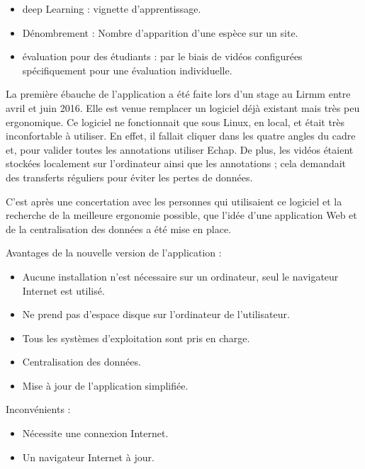 \documentclass[12pt]{article}
\begin{document}
\begin{itemize}
\item deep Learning : vignette d’apprentissage.
\item Dénombrement : Nombre d'apparition d'une espèce sur un site.
\item évaluation pour des étudiants : par le biais de vidéos configurées spécifiquement pour une évaluation individuelle.
\end{itemize}

\par

La première ébauche de l’application a été faite lors d’un stage au Lirmm entre avril et juin 2016. Elle est venue remplacer un logiciel déjà existant mais très peu ergonomique. Ce logiciel ne fonctionnait que sous Linux, en local, et était très inconfortable à utiliser. En effet, il fallait cliquer dans les quatre angles du cadre et, pour valider toutes les annotations utiliser Echap. De plus, les vidéos étaient stockées localement sur l’ordinateur ainsi que les annotations ; cela demandait des transferts réguliers pour éviter les pertes de données.
\par
C’est après une concertation avec les personnes qui utilisaient ce logiciel et la recherche de la meilleure ergonomie possible, que l’idée d’une application Web et de la centralisation des données a été mise en place.

Avantages de la nouvelle version de l'application :

\begin{itemize}
    \item Aucune installation n’est nécessaire sur un ordinateur, seul le navigateur Internet est utilisé. \item Ne prend pas d’espace disque sur l'ordinateur de l'utilisateur.
    \item Tous les systèmes d’exploitation sont pris en charge.
    \item Centralisation des données.
    \item Mise à jour de l’application simplifiée.
\end{itemize}
\par Inconvénients :
\begin{itemize}
    \item Nécessite une connexion Internet.
    \item Un navigateur Internet à jour.
\end{itemize}
\end{document}
